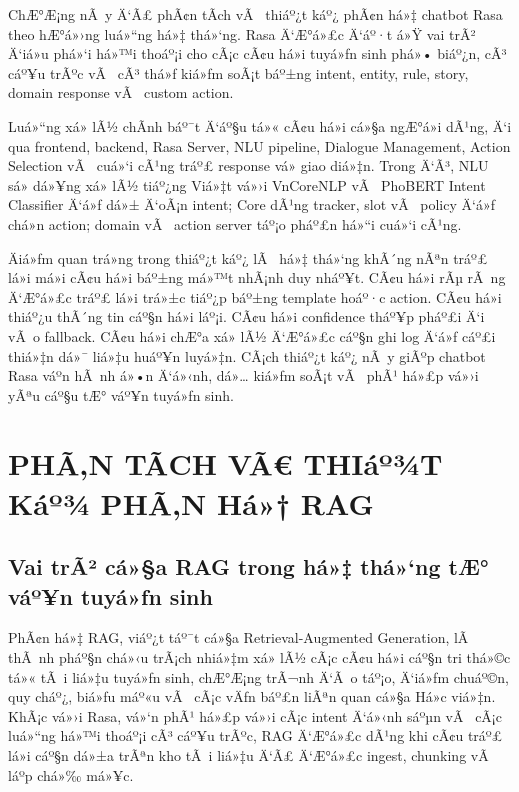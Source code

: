 ﻿\documentclass[12pt,a4paper]{report}
\begin{document}
ChÆ°Æ¡ng nÃ y Ä‘Ã£ phÃ¢n tÃ­ch vÃ  thiáº¿t káº¿ phÃ¢n há»‡ chatbot Rasa theo hÆ°á»›ng luá»“ng há»‡ thá»‘ng. Rasa Ä‘Æ°á»£c Ä‘áº·t á»Ÿ vai trÃ² Ä‘iá»u phá»‘i há»™i thoáº¡i cho cÃ¡c cÃ¢u há»i tuyá»ƒn sinh phá»• biáº¿n, cÃ³ cáº¥u trÃºc vÃ  cÃ³ thá»ƒ kiá»ƒm soÃ¡t báº±ng intent, entity, rule, story, domain response vÃ  custom action.

Luá»“ng xá»­ lÃ½ chÃ­nh báº¯t Ä‘áº§u tá»« cÃ¢u há»i cá»§a ngÆ°á»i dÃ¹ng, Ä‘i qua frontend, backend, Rasa Server, NLU pipeline, Dialogue Management, Action Selection vÃ  cuá»‘i cÃ¹ng tráº£ response vá» giao diá»‡n. Trong Ä‘Ã³, NLU sá»­ dá»¥ng xá»­ lÃ½ tiáº¿ng Viá»‡t vá»›i VnCoreNLP vÃ  PhoBERT Intent Classifier Ä‘á»ƒ dá»± Ä‘oÃ¡n intent; Core dÃ¹ng tracker, slot vÃ  policy Ä‘á»ƒ chá»n action; domain vÃ  action server táº¡o pháº£n há»“i cuá»‘i cÃ¹ng.

Äiá»ƒm quan trá»ng trong thiáº¿t káº¿ lÃ  há»‡ thá»‘ng khÃ´ng nÃªn tráº£ lá»i má»i cÃ¢u há»i báº±ng má»™t nhÃ¡nh duy nháº¥t. CÃ¢u há»i rÃµ rÃ ng Ä‘Æ°á»£c tráº£ lá»i trá»±c tiáº¿p báº±ng template hoáº·c action. CÃ¢u há»i thiáº¿u thÃ´ng tin cáº§n há»i láº¡i. CÃ¢u há»i confidence tháº¥p pháº£i Ä‘i vÃ o fallback. CÃ¢u há»i chÆ°a xá»­ lÃ½ Ä‘Æ°á»£c cáº§n ghi log Ä‘á»ƒ cáº£i thiá»‡n dá»¯ liá»‡u huáº¥n luyá»‡n. CÃ¡ch thiáº¿t káº¿ nÃ y giÃºp chatbot Rasa váº­n hÃ nh á»•n Ä‘á»‹nh, dá»… kiá»ƒm soÃ¡t vÃ  phÃ¹ há»£p vá»›i yÃªu cáº§u tÆ° váº¥n tuyá»ƒn sinh.






\chapter{PHÃ‚N TÃCH VÃ€ THIáº¾T Káº¾ PHÃ‚N Há»† RAG}

\section{Vai trÃ² cá»§a RAG trong há»‡ thá»‘ng tÆ° váº¥n tuyá»ƒn sinh}

PhÃ¢n há»‡ RAG, viáº¿t táº¯t cá»§a Retrieval-Augmented Generation, lÃ  thÃ nh pháº§n chá»‹u trÃ¡ch nhiá»‡m xá»­ lÃ½ cÃ¡c cÃ¢u há»i cáº§n tri thá»©c tá»« tÃ i liá»‡u tuyá»ƒn sinh, chÆ°Æ¡ng trÃ¬nh Ä‘Ã o táº¡o, Ä‘iá»ƒm chuáº©n, quy cháº¿, biá»ƒu máº«u vÃ  cÃ¡c vÄƒn báº£n liÃªn quan cá»§a Há»c viá»‡n. KhÃ¡c vá»›i Rasa, vá»‘n phÃ¹ há»£p vá»›i cÃ¡c intent Ä‘á»‹nh sáºµn vÃ  cÃ¡c luá»“ng há»™i thoáº¡i cÃ³ cáº¥u trÃºc, RAG Ä‘Æ°á»£c dÃ¹ng khi cÃ¢u tráº£ lá»i cáº§n dá»±a trÃªn kho tÃ i liá»‡u Ä‘Ã£ Ä‘Æ°á»£c ingest, chunking vÃ  láº­p chá»‰ má»¥c.
\end{document}
